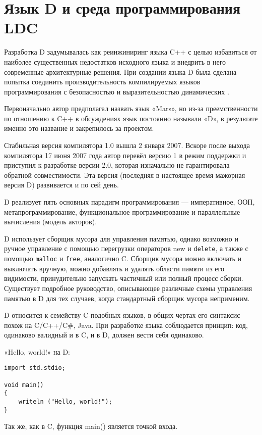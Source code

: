 \documentclass{studrep}
\begin{document}
\chapter{Язык D и среда программирования LDC}

Разработка D задумывалась как реинжиниринг языка C++ с целью избавиться от наиболее существенных недостатков исходного языка и внедрить в него современные архитектурные решения. При создании языка D была сделана попытка соединить производительность компилируемых языков программирования с безопасностью и выразительностью динамических \cite{wikipedia}.

Первоначально автор предполагал назвать язык «Mars», но из-за преемственности по отношению к C++ в обсуждениях язык постоянно называли «D», в результате именно это название и закрепилось за проектом.

Стабильная версия компилятора 1.0 вышла 2 января 2007. Вскоре после выхода компилятора 17 июня 2007 года автор перевёл версию 1 в режим поддержки и приступил к разработке версии 2.0, которая изначально не гарантировала обратной совместимости. Эта версия (последняя в настоящее время мажорная версия D) развивается и по сей день.

D реализует пять основных парадигм программирования — императивное, ООП, метапрограммирование, функциональное программирование и параллельные вычисления (модель акторов).

D использует сборщик мусора для управления памятью, однако возможно и ручное управление с помощью перегрузки операторов new и \texttt{delete}, а также с помощью \texttt{malloc} и \texttt{free}, аналогично C. Сборщик мусора можно включать и выключать вручную, можно добавлять и удалять области памяти из его видимости, принудительно запускать частичный или полный процесс сборки. Существует подробное руководство, описывающее различные схемы управления памятью в D для тех случаев, когда стандартный сборщик мусора неприменим.

D относится к семейству C-подобных языков, в общих чертах его синтаксис похож на C/C++/C\#, Java. При разработке языка соблюдается принцип: код, одинаково валидный и в C, и в D, должен вести себя одинаково.

«Hello, world!» на D:
\begin{verbatim}
import std.stdio;

void main()
{
    writeln ("Hello, world!");
}
\end{verbatim}
Так же, как в C, функция main() является точкой входа.
\end{document}
